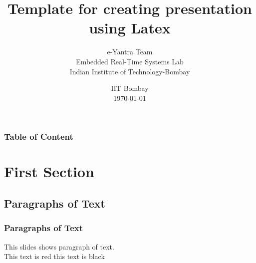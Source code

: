 \documentclass[table,10pt,red]{beamer}	%
\title
[
	This is at bottom of all page	%
	\hspace{0.5cm}
	\insertframenumber/\inserttotalframenumber
]
{
	Template for creating presentation using Latex 
}
\author
[
	www.e-yantra.org 	%
]
{
	e-Yantra Team \\
  Embedded Real-Time Systems Lab\\
  Indian Institute of Technology-Bombay \\
}
\date
{
IIT Bombay \\ {\today}	%
}
\begin{document}

\begin{frame}	%
	\titlepage %
\end{frame}

\begin{frame}
	\frametitle{Table of Content} %
	\tableofcontents %
\end{frame}


\section{First Section} %

\subsection{Paragraphs of Text} %

\begin{frame}
	\frametitle{Paragraphs of Text}
 		This slides shows paragraph of text. \\
 		
 		\color{red} This text is red  \color{black} this text is black
\end{frame}
\end{document}
